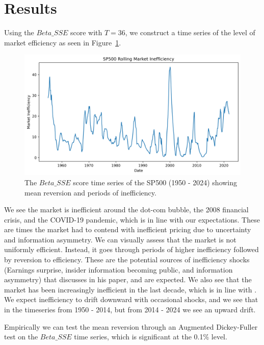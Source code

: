 \section{Results}
\label{sec:results}

Using the $Beta\_SSE$ score with $T=36$, we construct a time series of the level of market efficiency as 
seen in Figure~\ref{fig:sp_500_SSE_beta_ts}.
\begin{figure}[h!]
    \centering
    \includegraphics[width=1\textwidth]{../figs/SP500_Rolling_Market_Inefficiency.png}
    \caption{The $Beta\_SSE$ score time series of the SP500 (1950 - 2024) showing mean reversion and periods of inefficiency.}
    \label{fig:sp_500_SSE_beta_ts}
\end{figure}

We see the market is inefficient around the dot-com bubble, the 2008 financial crisis, and the COVID-19 pandemic, which is in line with our expectations.
These are times the market had to contend with inefficient pricing due to uncertainty and information asymmetry.
We can visually assess that the market is not uniformly efficient. Instead, it goes through periods of higher inefficiency followed by reversion to efficiency.
These are the potential sources of inefficiency shocks (Earnings surprise, insider information becoming public, and information asymmetry) that \citet{fama_EMH} discusses in his paper, and are expected.
We also see that the market has been increasingly inefficient in the last decade, which is in line with \citet{asness_2024}.
We expect inefficiency to drift downward with occasional shocks, and we see that in the timeseries from 1950 - 2014, but from 2014 - 2024 we see an upward drift.

Empirically we can test the mean reversion through an Augmented Dickey-Fuller test \citep{cheung1995lag} on the $Beta\_SSE$ time series, which is significant at the 0.1\% level.

